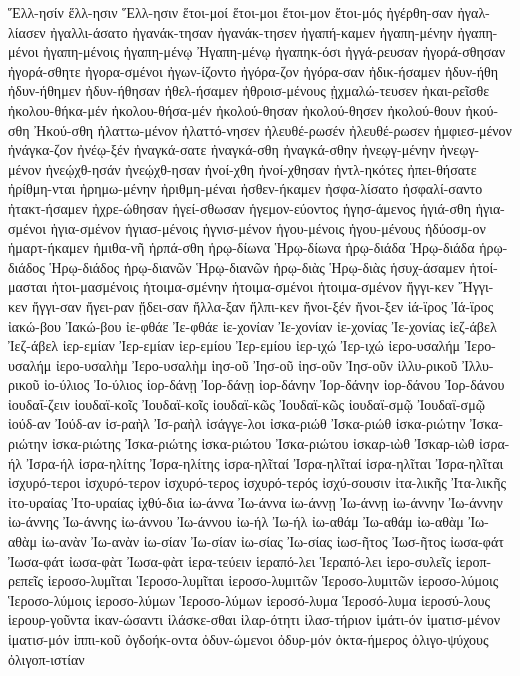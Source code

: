 {Ἕλλ-ησίν
ἕλλ-ησιν
Ἕλλ-ησιν
ἕτοι-μοί
ἕτοι-μοι
ἕτοι-μον
ἕτοι-μός
ἠγέρθη-σαν
ἠγαλ-λίασεν
ἠγαλλι-άσατο
ἠγανάκ-τησαν
ἠγανάκ-τησεν
ἠγαπή-καμεν
ἠγαπη-μένην
ἠγαπη-μένοι
ἠγαπη-μένοις
ἠγαπη-μένῳ
Ἠγαπη-μένῳ
ἠγαπηκ-όσι
ἠγγά-ρευσαν
ἠγορά-σθησαν
ἠγορά-σθητε
ἠγορα-σμένοι
ἠγων-ίζοντο
ἠγόρα-ζον
ἠγόρα-σαν
ἠδικ-ήσαμεν
ἠδυν-ήθη
ἠδυν-ήθημεν
ἠδυν-ήθησαν
ἠθελ-ήσαμεν
ἠθροισ-μένους
ᾐχμαλώ-τευσεν
ἠκαι-ρεῖσθε
ἠκολου-θήκα-μέν
ἠκολου-θήσα-μέν
ἠκολού-θησαν
ἠκολού-θησεν
ἠκολού-θουν
ἠκού-σθη
Ἠκού-σθη
ἠλαττω-μένον
ἠλαττό-νησεν
ἠλευθέ-ρωσέν
ἠλευθέ-ρωσεν
ἠμφιεσ-μένον
ἠνάγκα-ζον
ἠνέῳ-ξέν
ἠναγκά-σατε
ἠναγκά-σθη
ἠναγκά-σθην
ἠνεῳγ-μένην
ἠνεῳγ-μένον
ἠνεῴχθ-ησάν
ἠνεῴχθ-ησαν
ἠνοί-χθη
ἠνοί-χθησαν
ἠντλ-ηκότες
ἠπει-θήσατε
ἠρίθμη-νται
ἠρημω-μένην
ἠριθμη-μέναι
ἠσθεν-ήκαμεν
ἠσφα-λίσατο
ἠσφαλί-σαντο
ἠτακτ-ήσαμεν
ἠχρε-ώθησαν
ἡγεί-σθωσαν
ἡγεμον-εύοντος
ἡγησ-άμενος
ἡγιά-σθη
ἡγια-σμένοι
ἡγια-σμένον
ἡγιασ-μένοις
ἡγνισ-μένον
ἡγου-μένοις
ἡγου-μένους
ἡδύοσμ-ον
ἡμαρτ-ήκαμεν
ἡμιθα-νῆ
ἡρπά-σθη
ἡρῳ-δίωνα
Ἡρῳ-δίωνα
ἡρῳ-διάδα
Ἡρῳ-διάδα
ἡρῳ-διάδος
Ἡρῳ-διάδος
ἡρῳ-διανῶν
Ἡρῳ-διανῶν
ἡρῳ-διὰς
Ἡρῳ-διὰς
ἡσυχ-άσαμεν
ἡτοί-μασται
ἡτοι-μασμένοις
ἡτοιμα-σμένην
ἡτοιμα-σμένοι
ἡτοιμα-σμένον
ἤγγι-κεν
Ἤγγι-κεν
ἤγγι-σαν
ἤγει-ραν
ᾔδει-σαν
ἤλλα-ξαν
ἤλπι-κεν
ἤνοι-ξέν
ἤνοι-ξεν
ἰά-ϊρος
Ἰά-ϊρος
ἰακώ-βου
Ἰακώ-βου
ἰε-φθάε
Ἰε-φθάε
ἰε-χονίαν
Ἰε-χονίαν
ἰε-χονίας
Ἰε-χονίας
ἰεζ-άβελ
Ἰεζ-άβελ
ἰερ-εμίαν
Ἰερ-εμίαν
ἰερ-εμίου
Ἰερ-εμίου
ἰερ-ιχώ
Ἰερ-ιχώ
ἰερο-υσαλήμ
Ἰερο-υσαλήμ
ἰερο-υσαλὴμ
Ἰερο-υσαλὴμ
ἰησ-οῦ
Ἰησ-οῦ
ἰησ-οῦν
Ἰησ-οῦν
ἰλλυ-ρικοῦ
Ἰλλυ-ρικοῦ
ἰο-ύλιος
Ἰο-ύλιος
ἰορ-δάνῃ
Ἰορ-δάνῃ
ἰορ-δάνην
Ἰορ-δάνην
ἰορ-δάνου
Ἰορ-δάνου
ἰουδαΐ-ζειν
ἰουδαϊ-κοῖς
Ἰουδαϊ-κοῖς
ἰουδαϊ-κῶς
Ἰουδαϊ-κῶς
ἰουδαϊ-σμῷ
Ἰουδαϊ-σμῷ
ἰούδ-αν
Ἰούδ-αν
ἰσ-ραὴλ
Ἰσ-ραὴλ
ἰσάγγε-λοι
ἰσκα-ριώθ
Ἰσκα-ριώθ
ἰσκα-ριώτην
Ἰσκα-ριώτην
ἰσκα-ριώτης
Ἰσκα-ριώτης
ἰσκα-ριώτου
Ἰσκα-ριώτου
ἰσκαρ-ιὼθ
Ἰσκαρ-ιὼθ
ἰσρα-ήλ
Ἰσρα-ήλ
ἰσρα-ηλίτης
Ἰσρα-ηλίτης
ἰσρα-ηλῖταί
Ἰσρα-ηλῖταί
ἰσρα-ηλῖται
Ἰσρα-ηλῖται
ἰσχυρό-τεροι
ἰσχυρό-τερον
ἰσχυρό-τερος
ἰσχυρό-τερός
ἰσχύ-σουσιν
ἰτα-λικῆς
Ἰτα-λικῆς
ἰτο-υραίας
Ἰτο-υραίας
ἰχθύ-δια
ἰω-άννα
Ἰω-άννα
ἰω-άννῃ
Ἰω-άννῃ
ἰω-άννην
Ἰω-άννην
ἰω-άννης
Ἰω-άννης
ἰω-άννου
Ἰω-άννου
ἰω-ήλ
Ἰω-ήλ
ἰω-αθάμ
Ἰω-αθάμ
ἰω-αθὰμ
Ἰω-αθὰμ
ἰω-ανὰν
Ἰω-ανὰν
ἰω-σίαν
Ἰω-σίαν
ἰω-σίας
Ἰω-σίας
ἰωσ-ῆτος
Ἰωσ-ῆτος
ἰωσα-φάτ
Ἰωσα-φάτ
ἰωσα-φὰτ
Ἰωσα-φὰτ
ἱερα-τεύειν
ἱεραπό-λει
Ἱεραπό-λει
ἱερο-συλεῖς
ἱεροπ-ρεπεῖς
ἱεροσο-λυμῖται
Ἱεροσο-λυμῖται
ἱεροσο-λυμιτῶν
Ἱεροσο-λυμιτῶν
ἱεροσο-λύμοις
Ἱεροσο-λύμοις
ἱεροσο-λύμων
Ἱεροσο-λύμων
ἱεροσό-λυμα
Ἱεροσό-λυμα
ἱεροσύ-λους
ἱερουρ-γοῦντα
ἱκαν-ώσαντι
ἱλάσκε-σθαι
ἱλαρ-ότητι
ἱλασ-τήριον
ἱμάτι-όν
ἱματισ-μένον
ἱματισ-μόν
ἱππι-κοῦ
ὀγδοήκ-οντα
ὀδυν-ώμενοι
ὀδυρ-μόν
ὀκτα-ήμερος
ὀλιγο-ψύχους
ὀλιγοπ-ιστίαν
}
